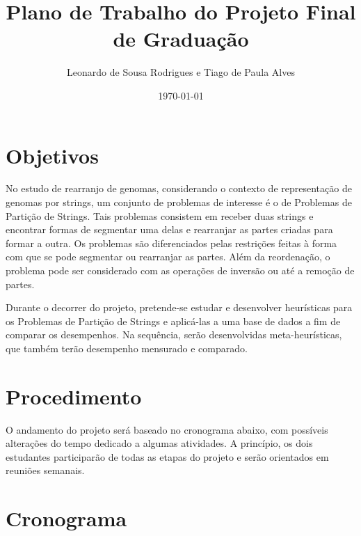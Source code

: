 \documentclass[a4paper, 11pt]{article}
\title{Plano de Trabalho do Projeto Final de Graduação}
\author{Leonardo de Sousa Rodrigues e Tiago de Paula Alves}
\date{\today}
\begin{document}
    \maketitle

    \section{Objetivos}
    
        No estudo de rearranjo de genomas, considerando o contexto de representação de genomas por strings, um conjunto de problemas de interesse é o de Problemas de Partição de Strings. Tais problemas consistem em receber duas strings e encontrar formas de segmentar uma delas e rearranjar as partes criadas para formar a outra. Os problemas são diferenciados pelas restrições feitas à forma com que se pode segmentar ou rearranjar as partes. Além da reordenação, o problema pode ser considerado com as operações de inversão ou até a remoção de partes.

        Durante o decorrer do projeto, pretende-se estudar e desenvolver heurísticas para os Problemas de Partição de Strings e aplicá-las a uma base de dados a fim de comparar os desempenhos. Na sequência, serão desenvolvidas meta-heurísticas, que também terão desempenho mensurado e comparado.

    \section{Procedimento}

        O andamento do projeto será baseado no cronograma abaixo, com possíveis alterações do tempo dedicado a algumas atividades. A princípio, os dois estudantes participarão de todas as etapas do projeto e serão orientados em reuniões semanais.

    \section{Cronograma}
\end{document}
